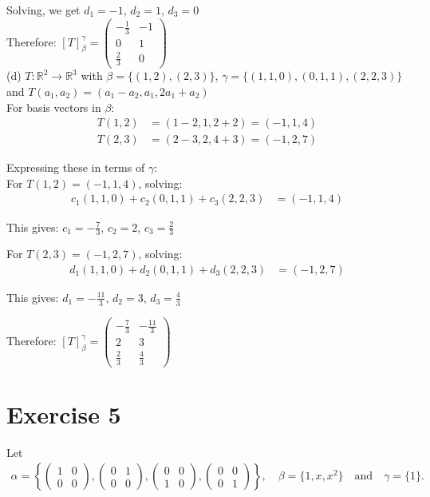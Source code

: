 \documentclass{article}
\begin{document}
Solving, we get $d_1 = -1$, $d_2 = 1$, $d_3 = 0$ \\

Therefore:
$[T]_\beta^\gamma = \begin{pmatrix} 
-\frac{1}{3} & -1 \\ 
0 & 1 \\ 
\frac{2}{3} & 0 
\end{pmatrix}$ \\

(d) $T : \mathbb{R}^2 \to \mathbb{R}^3$ with $\beta = \{(1,2),(2,3)\}$, $\gamma = \{(1,1,0),(0,1,1),(2,2,3)\}$ and $T(a_1, a_2) = (a_1 - a_2, a_1, 2a_1 + a_2)$ \\

For basis vectors in $\beta$:
\begin{align*}
T(1,2) &= (1-2, 1, 2+2) = (-1, 1, 4)\\
T(2,3) &= (2-3, 2, 4+3) = (-1, 2, 7)
\end{align*}

Expressing these in terms of $\gamma$: \\

For $T(1,2) = (-1, 1, 4)$, solving:
\begin{align*}
c_1(1,1,0) + c_2(0,1,1) + c_3(2,2,3) &= (-1,1,4)
\end{align*}

This gives: $c_1 = -\frac{7}{3}$, $c_2 = 2$, $c_3 = \frac{2}{3}$

For $T(2,3) = (-1, 2, 7)$, solving:
\begin{align*}
d_1(1,1,0) + d_2(0,1,1) + d_3(2,2,3) &= (-1,2,7)
\end{align*}

This gives: $d_1 = -\frac{11}{3}$, $d_2 = 3$, $d_3 = \frac{4}{3}$

Therefore:
$[T]_\beta^\gamma = \begin{pmatrix} 
-\frac{7}{3} & -\frac{11}{3} \\ 
2 & 3 \\ 
\frac{2}{3} & \frac{4}{3} 
\end{pmatrix}$

\newpage

\section*{Exercise 5}
Let
\begin{align*}
\alpha = \left\{\left(\begin{matrix} 1 & 0 \\ 0 & 0 \end{matrix}\right), \left(\begin{matrix} 0 & 1 \\ 0 & 0 \end{matrix}\right), \left(\begin{matrix} 0 & 0 \\ 1 & 0 \end{matrix}\right), \left(\begin{matrix} 0 & 0 \\ 0 & 1 \end{matrix}\right)\right\}, \quad \beta = \{1, x, x^2\} \quad \text{and} \quad \gamma = \{1\}.
\end{align*}
\end{document}
